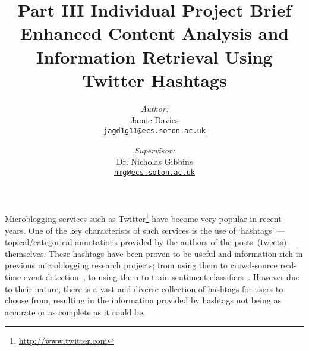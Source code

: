 \documentclass[a4paper,12pt]{article}
\title{
    \Large{Part III Individual Project Brief}\\[0.5cm]
    \huge{Enhanced Content Analysis and Information Retrieval Using Twitter Hashtags}
}
\date{\vspace{-5ex}}
\author{
    \emph{Author:}\\
    Jamie Davies\\
    \href{mailto:jagd1g11@ecs.soton.ac.uk}{\nolinkurl{jagd1g11@ecs.soton.ac.uk}}
    \and
    \emph{Supervisor:}\\
    Dr. Nicholas Gibbins\\
    \href{mailto:nmg@ecs.soton.ac.uk}{\nolinkurl{nmg@ecs.soton.ac.uk}}
}
\begin{document}

\maketitle
\vspace*{0.5cm}

Microblogging services such as Twitter\footnote{\url{http://www.twitter.com}} have become very popular in recent years. One of the key characterists of such services is the use of `hashtags' --- topical/categorical annotations provided by the authors of the posts~(tweets) themselves. These hashtags have been proven to be useful and information-rich in previous microblogging research projects; from using them to crowd-source real-time event detection~\cite{Sakaki:2010}, to using them to train sentiment classifiers~\cite{Davidov:2010}. However due to their nature, there is a vast and diverse collection of hashtags for users to choose from, resulting in the information provided by hashtags not being as accurate or as complete as it could be.


{\footnotesize }
\end{document}
